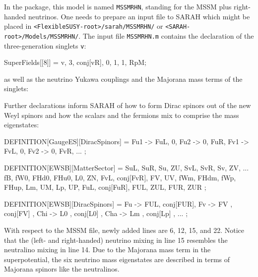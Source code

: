 \documentclass[final,3p,11pt,pdflatex]{elsarticle}
\makeatletter
\newcommand{\sarah}{SARAH\@\xspace}
\newcommand{\fs}{FlexibleSUSY\@\xspace}
\newcommand{\code}[1]{\lstinline|#1|}  %
\makeatother
\begin{document}
In the package, this model is named \code{MSSMRHN}, standing for
the MSSM plus right-handed neutrinos.
One needs to prepare an input file to \sarah which might be placed in
\code{<FlexibleSUSY-root>/sarah/MSSMRHN/} or
\code{<SARAH-root>/Models/MSSMRHN/}.
The input file \code{MSSMRHN.m} contains
the declaration of the three-generation singlets \code{v}:
\begin{numlstlisting}[name=MSSMRHN.m]
SuperFields[[8]] = {v, 3, conj[vR], 0, 1, 1, RpM};
\end{numlstlisting}
as well as the neutrino Yukawa couplings and the Majorana mass terms
of the singlets:
\begin{numlstlisting}[name=MSSMRHN.m]
SuperPotential = Yu u.q.Hu - Yd d.q.Hd - Ye e.l.Hd + \[Mu] Hu.Hd +
                 Yv v.l.Hu + Mv/2 v.v;
\end{numlstlisting}
Further declarations inform \sarah
of how to form Dirac spinors out of the new Weyl spinors
and how the scalars and the fermions mix to comprise
the mass eigenstates:
\begin{numlstlisting}[name=MSSMRHN.m]
DEFINITION[GaugeES][DiracSpinors] = {
  Fu1 -> {FuL, 0}, Fu2 -> {0, FuR},
  Fv1 -> {FvL, 0}, Fv2 -> {0, FvR},
  ...
};

DEFINITION[EWSB][MatterSector] = {
  {{SuL, SuR}, {Su, ZU}},
  {{SvL, SvR}, {Sv, ZV}},
  ...
  {{fB, fW0, FHd0, FHu0}, {L0, ZN}},
  {{FvL, conj[FvR]}, {FV, UV}},
  {{{fWm, FHdm}, {fWp, FHup}}, {{Lm, UM}, {Lp, UP}}},
  {{{FuL}, {conj[FuR]}}, {{FUL, ZUL}, {FUR, ZUR}}}
};

DEFINITION[EWSB][DiracSpinors] = {
  Fu  -> {FUL, conj[FUR]},
  Fv  -> {FV , conj[FV] },
  Chi -> {L0 , conj[L0] },
  Cha -> {Lm , conj[Lp] },
  ...
};
\end{numlstlisting}
With respect to the MSSM file, newly added lines are
6, 12, 15, and 22.
Notice that the (left- and right-handed) neutrino mixing
in line 15 resembles the neutralino mixing in line 14.
Due to the Majorana mass term in the superpotential,
the six neutrino mass eigenstates are described in terms of
Majorana spinors like the neutralinos.
\end{document}
